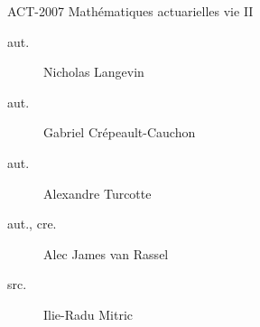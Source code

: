 \begin{contrib}{ACT-2007\: Mathématiques actuarielles vie II}
\begin{description}
	\item[aut.] Nicholas Langevin
	\item[aut.] Gabriel Crépeault-Cauchon 
	\item[aut.] Alexandre Turcotte 
	\item[aut., cre.] Alec James van Rassel
	\item[src.] Ilie-Radu Mitric
\end{description}
\end{contrib}
